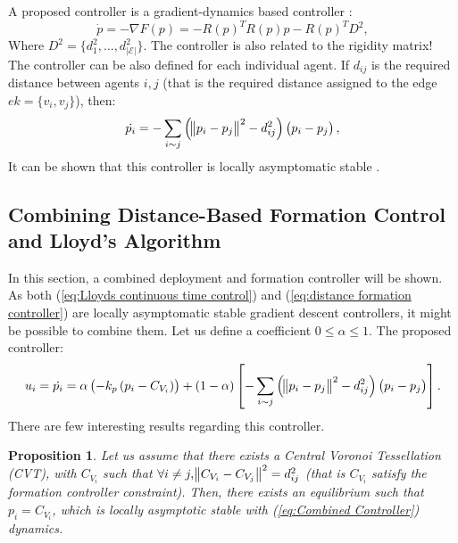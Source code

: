 \documentclass{iacas}
\newtheorem{proposition}{Proposition}
\begin{document}
A proposed controller is a gradient-dynamics based controller \cite{Kwang-KyoOh2011,Krick2008}:
\begin{equation}
\dot{p} = -\nabla F(p) = -R(p)^{T} R(p) p - R(p)^{T}D^2,
\label{eq:distance formation controller}
\end{equation}
Where $D^2 = \{d_1^2, \ldots, d_{|\mathcal{E}|}^2\}$. The controller is also related to the rigidity matrix!\\
The controller can be also defined for each individual agent. If $d_{ij}$ is the required distance between agents $i,j$ (that is the required distance assigned to the edge $ek = \{v_i, v_j\}$), then:
\begin{equation}
    \dot{p_{i}} = -\sum_{i \sim j} \left( \norm{p_{i} - p_{j}}^{2} - d_{ij}^2 \right) \left( p_{i} - p_{j} \right),
    \label{eq:distance formation controller for individual agent}
\end{equation}
It can be shown that this controller is locally asymptomatic stable \cite{Kwang-KyoOh2011,Krick2008}.

\subsection{Combining Distance-Based Formation Control and Lloyd's Algorithm}
In this section, a combined deployment and formation controller will be shown. As both (\ref{eq:Lloyds continuous time control}) and (\ref{eq:distance formation controller}) are locally asymptomatic stable gradient descent controllers, it might be possible to combine them. Let us define a coefficient $0 \leq \alpha \leq 1$. The proposed controller:
\begin{equation}
    u_{i} = \dot{p_{i}} = \alpha \left(-k_{p}\left( p_i -C_{V_{i}} \right)\right) +
    \left( 1-\alpha \right)\left[-\sum_{i \sim j} \left( \norm{p_{i} - p_{j}}^{2} - d_{ij}^2 \right) \left( p_{i} - p_{j} \right)  \right].
    \label{eq:Combined Controller}
\end{equation}
There are few interesting results regarding this controller.

\begin{proposition}
    Let us assume that there exists a Central Voronoi Tessellation (CVT), with $C_{V_{i}}$ such that $\forall i \neq j, \norm{C_{V_{i}} - C_{V_{j}}}^{2} = d_{ij}^{2}$ (that is $C_{V_{i}}$ satisfy the formation controller constraint). Then, there exists an equilibrium such that $p_{i} = C_{V_{i}}$, which is locally asymptotic stable with (\ref{eq:Combined Controller}) dynamics.
    \label{proposition 1}
\end{proposition}
\end{document}
